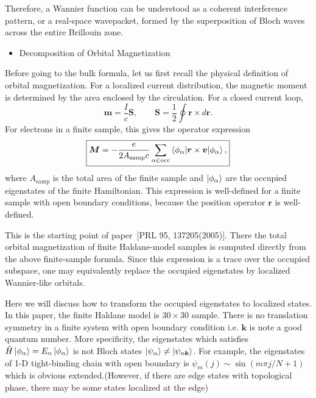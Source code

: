 \documentclass[12pt, oneside]{article}
\newcommand{\mr}[1]{\mathrm{#1}}
\newcommand{\p}[1]{\left(#1\right)}
\numberwithin{equation}{subsection}
\begin{document}
Therefore, a Wannier function can be understood as a coherent interference pattern, or a real-space wavepacket, formed by the superposition of Bloch waves across the entire Brillouin zone.

\vspace{2em}
\begin{itemize}
	\item Decomposition of Orbital Magnetization
\end{itemize}
Before going to the bulk formula, let us first recall the physical
definition of orbital magnetization. For a localized current distribution,
the magnetic moment is determined by the area enclosed by the circulation.
For a closed current loop,
\begin{equation}
	\bm{m} = \frac{I}{c}\bm{S}, \qquad \bm{S} = \frac12 \oint \bm{r}\times d\bm{r}.
\end{equation}
For electrons in a finite sample, this gives the operator expression
\begin{equation}
	\boxed{
		\bm{M} = -\frac{e}{2A_{\mr{samp}}c}\sum_{\alpha\in\mr{occ}}\braket{\phi_\alpha|\bm{r}\times\bm{v}|\phi_\alpha},
	}
\end{equation}
where \(A_{\mr{samp}}\) is the total area of the finite sample and
\(\ket{\phi_\alpha}\) are the occupied eigenstates of the finite
Hamiltonian. This expression is well-defined for a finite sample with
open boundary conditions, because the position operator \(\bm{r}\) is
well-defined.

This is the starting point of paper~[PRL 95, 137205(2005)]. There the total 
orbital magnetization of finite Haldane-model samples is computed
directly from the above finite-sample formula. Since this expression is
a trace over the occupied subspace, one may equivalently replace the
occupied eigenstates by localized Wannier-like orbitals. 

Here we will discuss how to transform the occupied eigenstates to localized states. In this paper, the finite Haldane model is \(30 \times 30\) sample. There is no translation symmetry in a finite system with open boundary condition i.e. \(\bm{k}\) is note a good quantum number. More specificity, the eigenstates which satisfies \(\hat{H} \ket{\phi_{\alpha}} = E_{\alpha} \ket{\phi_{\alpha}}\) is not Bloch states \(\ket{\psi_{\alpha} } \neq \ket{\psi_{n \bm{k}}}\). For example, the eigenstates of 1-D tight-binding chain with open boundary is \(\psi_m \p{j} \sim \sin \p{m \pi j /N+1}\) which is obvious extended.(However, if there are edge states with topological phase, there may be some states localized at the edge)
\end{document}
